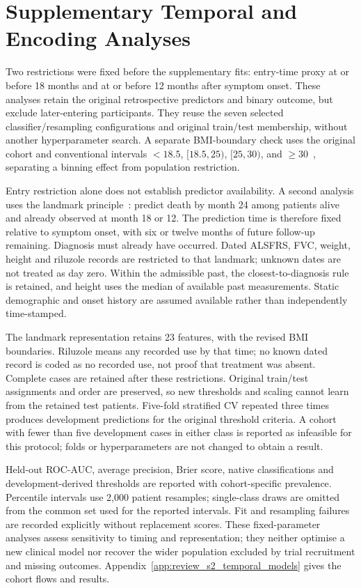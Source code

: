 \section{Supplementary Temporal and Encoding Analyses}
\label{sec:s2_temporal_sensitivity}

Two restrictions were fixed before the supplementary fits: entry-time proxy at or before 18 months and at or before 12 months after symptom onset. These analyses retain the original retrospective predictors and binary outcome, but exclude later-entering participants. They reuse the seven selected classifier/resampling configurations and original train/test membership, without another hyperparameter search. A separate BMI-boundary check uses the original cohort and conventional intervals $<18.5$, $[18.5,25)$, $[25,30)$, and $\geq30$~\cite{WHOBMI}, separating a binning effect from population restriction.

Entry restriction alone does not establish predictor availability. A second analysis uses the landmark principle~\cite{vanhouwelingen2007landmark}: predict death by month 24 among patients alive and already observed at month 18 or 12. The prediction time is therefore fixed relative to symptom onset, with six or twelve months of future follow-up remaining. Diagnosis must already have occurred. Dated ALSFRS, FVC, weight, height and riluzole records are restricted to that landmark; unknown dates are not treated as day zero. Within the admissible past, the closest-to-diagnosis rule is retained, and height uses the median of available past measurements. Static demographic and onset history are assumed available rather than independently time-stamped.

The landmark representation retains 23 features, with the revised BMI boundaries. Riluzole means any recorded use by that time; no known dated record is coded as no recorded use, not proof that treatment was absent. Complete cases are retained after these restrictions. Original train/test assignments and order are preserved, so new thresholds and scaling cannot learn from the retained test patients. Five-fold stratified CV repeated three times produces development predictions for the original threshold criteria. A cohort with fewer than five development cases in either class is reported as infeasible for this protocol; folds or hyperparameters are not changed to obtain a result.

Held-out ROC-AUC, average precision, Brier score, native classifications and development-derived thresholds are reported with cohort-specific prevalence. Percentile intervals use 2,000 patient resamples; single-class draws are omitted from the common set used for the reported intervals. Fit and resampling failures are recorded explicitly without replacement scores. These fixed-parameter analyses assess sensitivity to timing and representation; they neither optimise a new clinical model nor recover the wider population excluded by trial recruitment and missing outcomes. Appendix~\ref{app:review_s2_temporal_models} gives the cohort flows and results.

